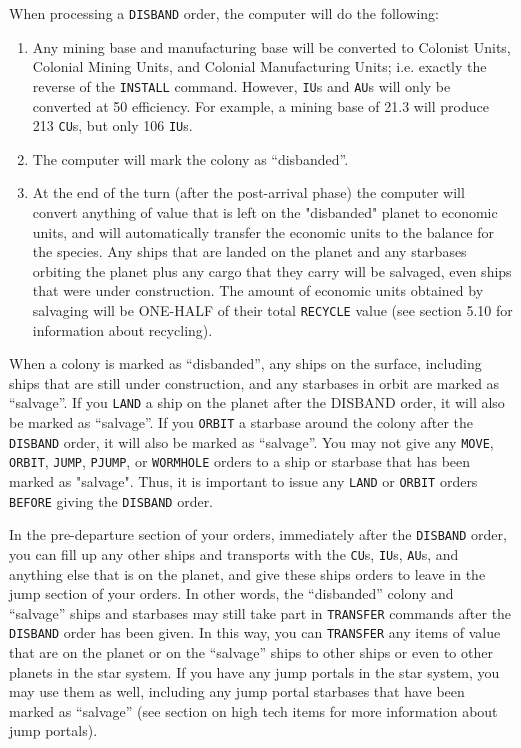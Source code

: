 \documentclass[10pt,titlepage]{article}
\begin{document}
When processing a \texttt{DISBAND} order, the computer will do the following:
\begin{enumerate}
	\item Any mining base and manufacturing base will be converted
	to Colonist Units, Colonial Mining Units, and Colonial
	Manufacturing Units; i.e. exactly the reverse of the \texttt{INSTALL}
	command.  However, \texttt{IU}s and \texttt{AU}s will only be converted at 50%
	efficiency.  For example, a mining base of 21.3 will produce
	213 \texttt{CU}s, but only 106 \texttt{IU}s.

	\item The computer will mark the colony as ``disbanded''.

	\item At the end of the turn (after the post-arrival phase) the
	computer will convert anything of value that is left on the
	"disbanded" planet to economic units, and will automatically
	transfer the economic units to the balance for the species.  Any
	ships that are landed on the planet and any starbases orbiting
	the planet plus any cargo that they carry will be salvaged, even
	ships that were under construction.  The amount of economic units
	obtained by salvaging will be ONE-HALF of their total \texttt{RECYCLE}
	value (see section 5.10 for information about recycling).
\end{enumerate}
When a colony is marked as ``disbanded'', any ships on the surface, including
ships that are still under construction, and any starbases in orbit are marked
as ``salvage''.  If you \texttt{LAND} a ship on the planet after the DISBAND order, it
will also be marked as ``salvage''.  If you \texttt{ORBIT} a starbase around the colony
after the \texttt{DISBAND} order, it will also be marked as ``salvage''.  You may not give
any \texttt{MOVE}, \texttt{ORBIT}, \texttt{JUMP}, \texttt{PJUMP}, or \texttt{WORMHOLE} orders to a ship or starbase that has
been marked as "salvage".  Thus, it is important to issue any \texttt{LAND} or \texttt{ORBIT}
orders \texttt{BEFORE} giving the \texttt{DISBAND} order.

In the pre-departure section of your orders, immediately after the \texttt{DISBAND}
order, you can fill up any other ships and transports with the \texttt{CU}s, \texttt{IU}s, \texttt{AU}s,
and anything else that is on the planet, and give these ships orders to leave
in the jump section of your orders.  In other words, the ``disbanded'' colony and
``salvage'' ships and starbases may still take part in \texttt{TRANSFER} commands after
the \texttt{DISBAND} order has been given.  In this way, you can \texttt{TRANSFER} any items of
value that are on the planet or on the ``salvage'' ships to other ships or even
to other planets in the star system.  If you have any jump portals in the star
system, you may use them as well, including any jump portal starbases that have
been marked as ``salvage'' (see section on high tech items for more information
about jump portals).
\end{document}
